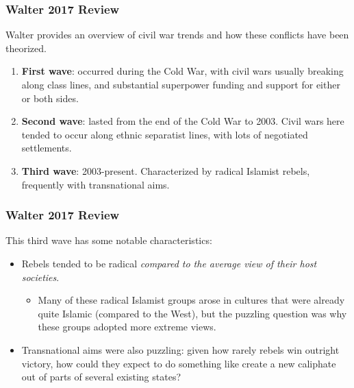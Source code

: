 \documentclass[handout]{beamer}
\begin{document}

\begin{frame} 
	\frametitle{\LARGE{Walter 2017 Review}}
Walter provides an overview of civil war trends and how these conflicts have been theorized.
	\begin{enumerate}
		\item \textbf{First wave}: occurred during the Cold War, with civil wars usually breaking along class lines, and substantial superpower funding and support for either or both sides. \pause
		\item \textbf{Second wave}: lasted from the end of the Cold War to 2003. Civil wars here tended to occur along ethnic separatist lines, with lots of negotiated settlements. \pause
		\item \textbf{Third wave}: 2003-present. Characterized by radical Islamist rebels, frequently with transnational aims.
	\end{enumerate}
\end{frame}

\begin{frame} 
	\frametitle{\LARGE{Walter 2017 Review}}
This third wave has some notable characteristics:
	\begin{itemize}
		\item Rebels tended to be radical \textit{compared to the average view of their host societies}. \pause
		\begin{itemize}
			\item Many of these radical Islamist groups arose in cultures that were already quite Islamic (compared to the West), but the puzzling question was why these groups adopted more extreme views. \pause
		\end{itemize}
	\item Transnational aims were also puzzling: given how rarely rebels win outright victory, how could they expect to do something like create a new caliphate out of parts of several existing states?
	\end{itemize}
\end{frame}
\end{document}
